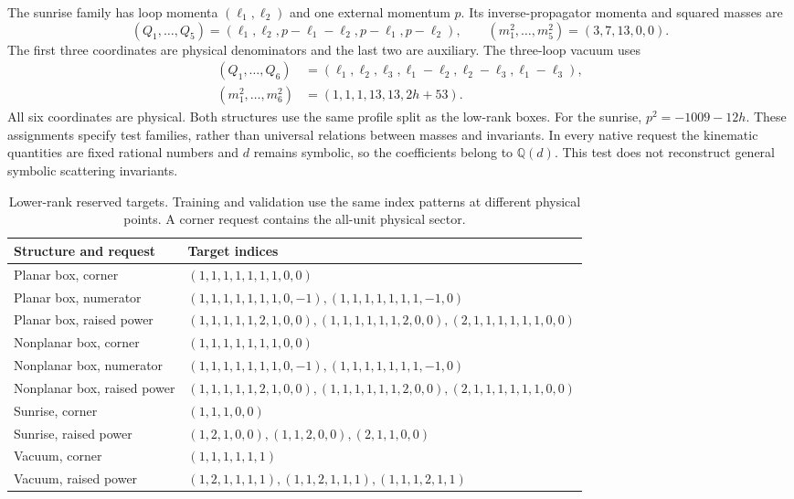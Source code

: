 \documentclass[11pt,a4paper]{article}
\providecommand{\Q}{\mathbb Q}
\begin{document}
The sunrise family has loop momenta $(\ell_1,\ell_2)$ and one external momentum $p$. Its inverse-propagator momenta and squared masses are
\begin{equation}
 (Q_1,\ldots,Q_5)=(\ell_1,\ell_2,p-\ell_1-\ell_2,p-\ell_1,p-\ell_2),
 \qquad (m_1^2,\ldots,m_5^2)=(3,7,13,0,0).
 \label{notes-reconstruction-eq:reconstruction-sunrise}
\end{equation}
The first three coordinates are physical denominators and the last two are auxiliary. The three-loop vacuum uses
\begin{align}
 (Q_1,\ldots,Q_6)&=(\ell_1,\ell_2,\ell_3,\ell_1-\ell_2,\ell_2-\ell_3,\ell_1-\ell_3),\nonumber\\
 (m_1^2,\ldots,m_6^2)&=(1,1,1,13,13,2h+53).
 \label{notes-reconstruction-eq:reconstruction-vacuum}
\end{align}
All six coordinates are physical. Both structures use the same profile split as the low-rank boxes. For the sunrise, $p^2=-1009-12h$. These assignments specify test families, rather than universal relations between masses and invariants. In every native request the kinematic quantities are fixed rational numbers and $d$ remains symbolic, so the coefficients belong to $\Q(d)$. This test does not reconstruct general symbolic scattering invariants.

\begin{table}[!htbp]\centering\small
\caption{Lower-rank reserved targets. Training and validation use the same index patterns at different physical points. A corner request contains the all-unit physical sector.}
\label{notes-reconstruction-tab:reconstruction-low-targets}
\begin{tabularx}{\linewidth}{@{}lY@{}}\toprule
Structure and request & Target indices\\\midrule
Planar box, corner & $(1,1,1,1,1,1,1,0,0)$ \\
Planar box, numerator & $(1,1,1,1,1,1,1,0,-1), (1,1,1,1,1,1,1,-1,0)$ \\
Planar box, raised power & $(1,1,1,1,1,2,1,0,0), (1,1,1,1,1,1,2,0,0), (2,1,1,1,1,1,1,0,0)$ \\
Nonplanar box, corner & $(1,1,1,1,1,1,1,0,0)$ \\
Nonplanar box, numerator & $(1,1,1,1,1,1,1,0,-1), (1,1,1,1,1,1,1,-1,0)$ \\
Nonplanar box, raised power & $(1,1,1,1,1,2,1,0,0), (1,1,1,1,1,1,2,0,0), (2,1,1,1,1,1,1,0,0)$ \\
Sunrise, corner & $(1,1,1,0,0)$ \\
Sunrise, raised power & $(1,2,1,0,0), (1,1,2,0,0), (2,1,1,0,0)$ \\
Vacuum, corner & $(1,1,1,1,1,1)$ \\
Vacuum, raised power & $(1,2,1,1,1,1), (1,1,2,1,1,1), (1,1,1,2,1,1)$ \\
\bottomrule\end{tabularx}\end{table}
\end{document}
